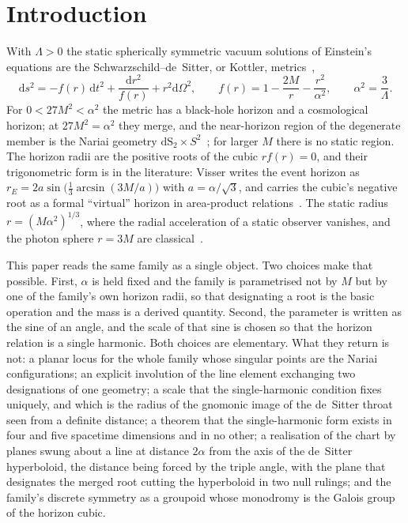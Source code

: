 \documentclass[11pt]{article}
\theoremstyle{plain}
\theoremstyle{definition}
\theoremstyle{remark}
\newcommand{\dd}{\mathrm{d}}
\begin{document}
\section{Introduction}\label{sec:intro}

With $\Lambda>0$ the static spherically symmetric vacuum solutions of Einstein's equations are the
Schwarzschild--de~Sitter, or Kottler, metrics~\cite{Kottler1918},
\begin{equation}\label{eq:sds}
\dd s^{2}=-f(r)\,\dd t^{2}+\frac{\dd r^{2}}{f(r)}+r^{2}\dd\Omega^{2},\qquad
f(r)=1-\frac{2M}{r}-\frac{r^{2}}{\alpha^{2}},\qquad \alpha^{2}=\frac{3}{\Lambda}.
\end{equation}
For $0<27M^{2}<\alpha^{2}$ the metric has a black-hole horizon and a cosmological horizon; at $27M^{2}=\alpha^{2}$
they merge, and the near-horizon region of the degenerate member is the Nariai geometry
$\mathrm{dS}_{2}\times S^{2}$~\cite{Nariai1951,GinspargPerry1983}; for larger $M$ there is no static region. The
horizon radii are the positive roots of the cubic $rf(r)=0$, and their trigonometric form is in the literature:
Visser writes the event horizon as $r_{E}=2a\sin\bigl(\tfrac13\arcsin(3M/a)\bigr)$ with $a=\alpha/\sqrt3$, and
carries the cubic's negative root as a formal ``virtual'' horizon in area-product relations~\cite{Visser2013}.
The static radius $r=(M\alpha^{2})^{1/3}$, where the radial acceleration of a static observer vanishes, and the
photon sphere $r=3M$ are classical~\cite{StuchlikHledik1999}.

This paper reads the same family as a single object. Two choices make that possible. First, $\alpha$ is held
fixed and the family is parametrised not by $M$ but by one of the family's own horizon radii, so that
designating a root is the basic operation and the mass is a derived quantity. Second, the parameter is written
as the sine of an angle, and the scale of that sine is chosen so that the horizon relation is a single harmonic.
Both choices are elementary. What they return is not: a planar locus for the whole family whose singular points
are the Nariai configurations; an explicit involution of the line element exchanging two designations of one
geometry; a scale that the single-harmonic condition fixes uniquely, and which is the radius of the gnomonic
image of the de~Sitter throat seen from a definite distance; a theorem that the single-harmonic form exists in
four and five spacetime dimensions and in no other; a realisation of the chart by planes swung about a line at distance $2\alpha$ from
the axis of the de~Sitter hyperboloid, the distance being forced by the triple angle, with the plane that
designates the merged root cutting the hyperboloid in two null rulings; and the family's discrete symmetry as a groupoid whose monodromy is the
Galois group of the horizon cubic.
\end{document}
